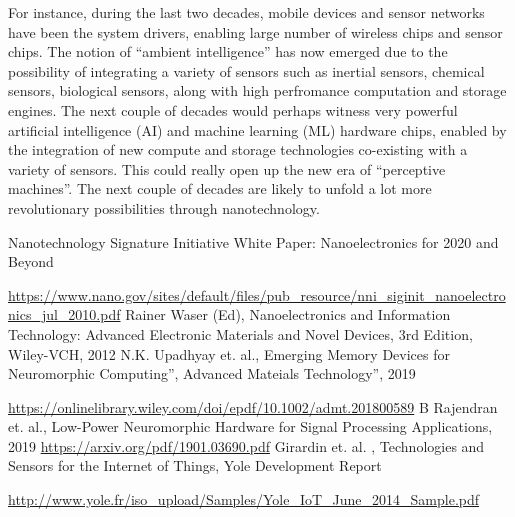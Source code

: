 \begin{multicols}{2}
For instance, during the last two decades, mobile devices and sensor networks have been the system drivers,  enabling large number of wireless chips and sensor chips. The notion of “ambient intelligence” has now emerged due to the possibility of integrating a variety of sensors such as inertial sensors, chemical sensors, biological sensors, along with high perfromance computation and storage engines. The next couple of decades would perhaps witness very powerful artificial intelligence (AI) and machine learning (ML) hardware chips, enabled by the integration of new compute and storage technologies co-existing with a variety of sensors. This could really open up the new era of “perceptive machines”. The next couple of decades are likely to unfold a lot more revolutionary possibilities through nanotechnology.

\begin{thebibliography}{99}
 Nanotechnology Signature Initiative White Paper: Nanoelectronics for 2020 and Beyond 

\url{https://www.nano.gov/sites/default/files/pub_resource/nni_siginit_nanoelectronics_jul_2010.pdf}
 Rainer Waser (Ed), Nanoelectronics and Information Technology: Advanced Electronic Materials and Novel Devices, 3rd Edition, Wiley-VCH, 2012
 N.K. Upadhyay et. al., Emerging Memory Devices for Neuromorphic Computing”, Advanced Mateials Technology”, 2019 

\url{https://onlinelibrary.wiley.com/doi/epdf/10.1002/admt.201800589}
 B Rajendran et. al., Low-Power Neuromorphic Hardware for Signal Processing Applications, 2019  \url{https://arxiv.org/pdf/1901.03690.pdf}
 Girardin et. al. , Technologies and Sensors for the Internet of Things, Yole Development Report 

\url{http://www.yole.fr/iso_upload/Samples/Yole_IoT_June_2014_Sample.pdf}
\end{thebibliography}
\end{multicols}

